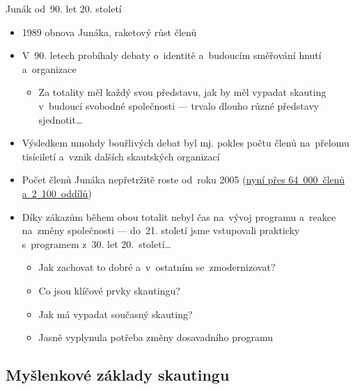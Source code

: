 \documentclass[compress, ucs, xelatex, 11pt, xcolor=dvipsnames, print, aspectratio=169,
	hyperref={
		bookmarks=true,
		unicode=true,
		colorlinks=true,
		pdftitle={Skautska vychovna metoda},
		plainpages=false,
		pdfauthor={Vojtech Zeisek},
		pdfsubject={Skautska vychovna metoda a jeji vyvoj za posledni stoleti a desetileti},
		pdfcreator={XeLaTeX},
		pdfkeywords={Junak, Pedagogika, Skaut, Skauting, Vychovna metoda},
		linkcolor=Red, %
		anchorcolor=ForestGreen, %
		citecolor=ForestGreen, %
		filecolor=ForestGreen, %
		menucolor=ForestGreen, %
		urlcolor=Sepia, %
		pdftex},
	url={hyphens, lowtilde} %
	]{beamer}
\begin{document}
\begin{frame}{Junák od~90. let 20. století}
	\begin{itemize}
		\item 1989 obnova Junáka, raketový růst členů
		\item V~90. letech probíhaly debaty o~identitě a~budoucím směřování hnutí a~organizace
		\begin{itemize}
			\item Za totality měl každý svou představu, jak by měl vypadat skauting v~budoucí svobodné společnosti --- trvalo dlouho různé představy sjednotit\ldots
		\end{itemize}
		\item Výsledkem mnohdy bouřlivých debat byl mj. pokles počtu členů na~přelomu tisíciletí a~vznik dalších skautských organizací
		\item Počet členů Junáka nepřetržitě roste od~roku 2005 (\href{https://www.skaut.cz/skauting/fakta-a-cisla/}{nyní přes 64~000~členů a~2~100~oddílů})
		\item Díky zákazům během obou totalit nebyl čas na~vývoj programu a~reakce na~změny společnosti --- do~21. století jsme vstupovali prakticky s~programem z~30. let 20.~století\ldots
		\begin{itemize}
			\item Jak zachovat to dobré a~v~ostatním se~zmodernizovat?
			\item Co jsou klíčové prvky skautingu?
			\item Jak má vypadat současný skauting?
			\item Jasně vyplynula potřeba změny dosavadního programu
		\end{itemize}
	\end{itemize}
\end{frame}

\subsection{Myšlenkové základy skautingu}
\end{document}
